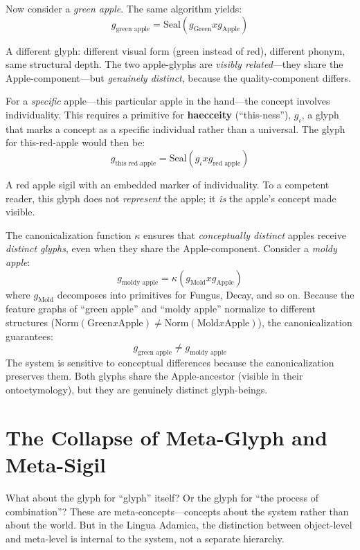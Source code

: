 \documentclass[12pt, letterpaper]{book}
\def\otimes{x}%
\def\mathfrak#1{#1}%
\begin{document}
Now consider a \textit{green apple}. The same algorithm yields:
\[
\mathfrak{g}_{\text{green apple}} = \mathrm{Seal}(\mathfrak{g}_\text{Green} \otimes \mathfrak{g}_\text{Apple})
\]

A different glyph: different visual form (green instead of red), different phonym, same structural depth. The two apple-glyphs are \textit{visibly related}---they share the Apple-component---but \textit{genuinely distinct}, because the quality-component differs.

For a \textit{specific} apple---this particular apple in the hand---the concept involves individuality. This requires a primitive for \textbf{haecceity} (``this-ness''), $\mathfrak{g}_\iota$, a glyph that marks a concept as a specific individual rather than a universal. The glyph for this-red-apple would then be:
\[
\mathfrak{g}_{\text{this red apple}} = \mathrm{Seal}(\mathfrak{g}_\iota \otimes \mathfrak{g}_{\text{red apple}})
\]

A red apple sigil with an embedded marker of individuality. To a competent reader, this glyph does not \textit{represent} the apple; it \textit{is} the apple's concept made visible.

The canonicalization function $\kappa$ ensures that \textit{conceptually distinct} apples receive \textit{distinct glyphs}, even when they share the Apple-component. Consider a \textit{moldy apple}:
\[
\mathfrak{g}_{\text{moldy apple}} = \kappa(\mathfrak{g}_\text{Mold} \otimes \mathfrak{g}_\text{Apple})
\]
where $\mathfrak{g}_\text{Mold}$ decomposes into primitives for Fungus, Decay, and so on. Because the feature graphs of ``green apple'' and ``moldy apple'' normalize to different structures ($\mathrm{Norm}(\text{Green} \otimes \text{Apple}) \neq \mathrm{Norm}(\text{Mold} \otimes \text{Apple})$), the canonicalization guarantees:
\[
\mathfrak{g}_{\text{green apple}} \neq \mathfrak{g}_{\text{moldy apple}}
\]
The system is sensitive to conceptual differences because the canonicalization preserves them. Both glyphs share the Apple-ancestor (visible in their ontoetymology), but they are genuinely distinct glyph-beings.

\section{The Collapse of Meta-Glyph and Meta-Sigil}

What about the glyph for ``glyph'' itself? Or the glyph for ``the process of combination''? These are meta-concepts---concepts about the system rather than about the world. But in the Lingua Adamica, the distinction between object-level and meta-level is internal to the system, not a separate hierarchy.
\end{document}
